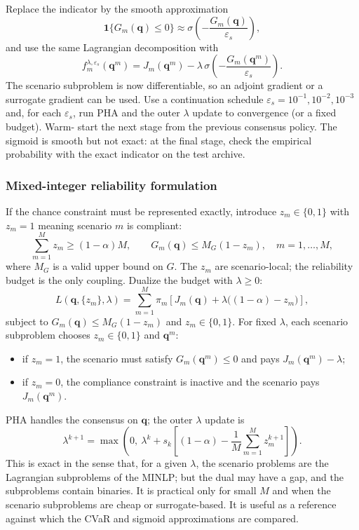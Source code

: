 \documentclass[11pt]{article}
\numberwithin{equation}{section}
\newcommand{\qq}{\mathbf{q}}
\newcommand{\ind}{\mathbf{1}}
\theoremstyle{plain}
\begin{document}
Replace the indicator by the smooth approximation
\begin{equation}
\label{eq:pha-sigmoid}
\ind\{G_m(\qq)\le0\}
\approx
\sigma\!\left(-\frac{G_m(\qq)}{\varepsilon_s}\right),
\end{equation}
and use the same Lagrangian decomposition with
\begin{equation}
\label{eq:pha-sigmoid-scenario}
f_m^{\lambda,\varepsilon_s}(\qq^m)
=J_m(\qq^m)
-\lambda\,\sigma\!\left(-\frac{G_m(\qq^m)}{\varepsilon_s}\right).
\end{equation}
The scenario subproblem is now differentiable, so an adjoint gradient or a
surrogate gradient can be used.  Use a continuation schedule
$\varepsilon_s=10^{-1},10^{-2},10^{-3}$ and, for each $\varepsilon_s$, run
PHA and the outer $\lambda$ update to convergence (or a fixed budget).  Warm-
start the next stage from the previous consensus policy.  The sigmoid is
smooth but not exact: at the final stage, check the empirical probability with
the exact indicator on the test archive.

\subsubsection{Mixed-integer reliability formulation}

If the chance constraint must be represented exactly, introduce
$z_m\in\{0,1\}$ with $z_m=1$ meaning scenario $m$ is compliant:
\begin{equation}
\label{eq:pha-minlp}
\sum_{m=1}^{M}z_m\ge(1-\alpha)M,
\qquad
G_m(\qq)\le M_G(1-z_m),\quad m=1,\dots,M,
\end{equation}
where $M_G$ is a valid upper bound on $G$.  The $z_m$ are scenario-local; the
reliability budget is the only coupling.  Dualize the budget with
$\lambda\ge0$:
\begin{equation}
\label{eq:pha-minlp-lag}
L(\qq,\{z_m\},\lambda)
=\sum_{m=1}^{M}\pi_m\left[
J_m(\qq)+\lambda\bigl((1-\alpha)-z_m\bigr)
\right],
\end{equation}
subject to $G_m(\qq)\le M_G(1-z_m)$ and $z_m\in\{0,1\}$.  For fixed $\lambda$,
each scenario subproblem chooses $z_m\in\{0,1\}$ and $\qq^m$:
\begin{itemize}[leftmargin=1.6em,itemsep=2pt]
  \item if $z_m=1$, the scenario must satisfy $G_m(\qq^m)\le0$ and pays
        $J_m(\qq^m)-\lambda$;
  \item if $z_m=0$, the compliance constraint is inactive and the scenario pays
        $J_m(\qq^m)$.
\end{itemize}
PHA handles the consensus on $\qq$; the outer $\lambda$ update is
\begin{equation}
\label{eq:pha-minlp-lambda}
\lambda^{k+1}
=\max\left(0,\
\lambda^k+s_k\left[(1-\alpha)
-\frac{1}{M}\sum_{m=1}^{M}z_m^{k+1}\right]\right).
\end{equation}
This is exact in the sense that, for a given $\lambda$, the scenario problems
are the Lagrangian subproblems of the MINLP; but the dual may have a gap, and
the subproblems contain binaries.  It is practical only for small $M$ and when
the scenario subproblems are cheap or surrogate-based.  It is useful as a
reference against which the CVaR and sigmoid approximations are compared.
\end{document}
